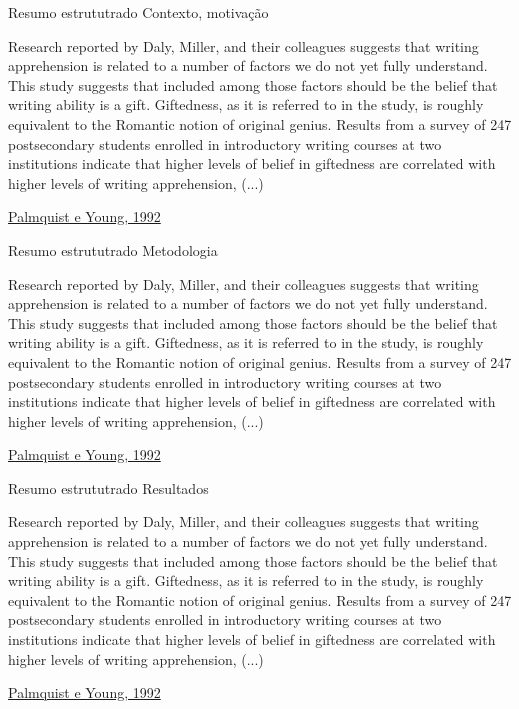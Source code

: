\documentclass{beamer}
\begin{document}
\begin{frame}{Resumo estrututrado}
  Contexto, motivação
  \begin{example}
    \alert{Research reported by Daly, Miller, and their colleagues
      suggests that writing apprehension is related to a number of
      factors we do not yet fully understand. This study suggests that
      included among those factors should be the belief that writing
      ability is a gift. Giftedness, as it is referred to in the
      study, is roughly equivalent to the Romantic notion of original
      genius.} Results from a survey of 247 postsecondary students
    enrolled in introductory writing courses at two institutions
    indicate that higher levels of belief in giftedness are correlated
    with higher levels of writing apprehension, (...)
  \end{example}

  \vfill
  \scriptsize
  \hfill \href{https://doi.org/10.1177/0741088392009001004}{Palmquist e Young, 1992}
\end{frame}

\begin{frame}{Resumo estrututrado}
Metodologia
  \begin{example}
    Research reported by Daly, Miller, and their colleagues suggests
    that writing apprehension is related to a number of factors we do
    not yet fully understand. This study suggests that included among
    those factors should be the belief that writing ability is a
    gift. Giftedness, as it is referred to in the study, is roughly
    equivalent to the Romantic notion of original genius. Results from
    \alert{a survey of 247 postsecondary students enrolled in
      introductory writing courses at two institutions} indicate that
    higher levels of belief in giftedness are correlated with higher
    levels of writing apprehension, (...)
  \end{example}

  \vfill
  \scriptsize
  \hfill \href{https://doi.org/10.1177/0741088392009001004}{Palmquist e Young, 1992}
\end{frame}

\begin{frame}{Resumo estrututrado}
Resultados
  \begin{example}
    Research reported by Daly, Miller, and their colleagues suggests
    that writing apprehension is related to a number of factors we do
    not yet fully understand. This study suggests that included among
    those factors should be the belief that writing ability is a
    gift. Giftedness, as it is referred to in the study, is roughly
    equivalent to the Romantic notion of original
    genius. \alert{Results} from a survey of 247 postsecondary
    students enrolled in introductory writing courses at two
    institutions \alert{indicate that higher levels of belief in
      giftedness are correlated with higher levels of writing
      apprehension,} (...)
  \end{example}

  \vfill
  \scriptsize
  \hfill \href{https://doi.org/10.1177/0741088392009001004}{Palmquist e Young, 1992}
\end{frame}
\end{document}
